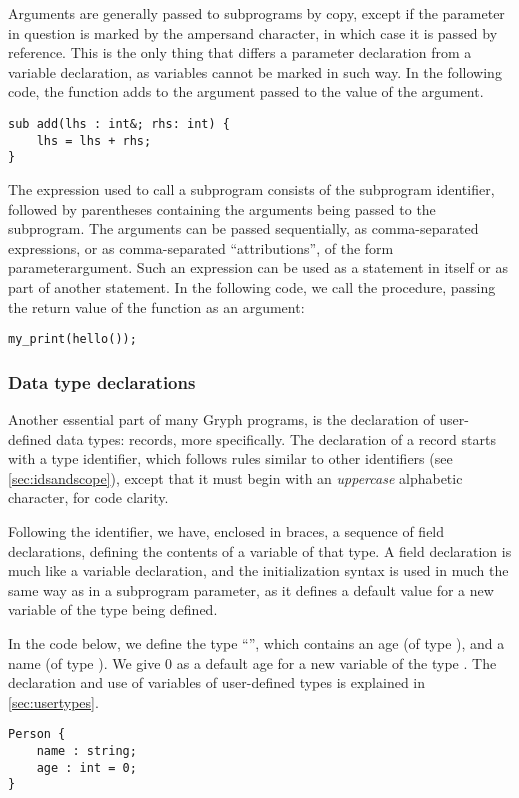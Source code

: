Arguments are generally passed to subprograms by copy, except if the parameter in question is marked by the ampersand character, in which case it is passed by reference. This is the only thing that differs a parameter declaration from a variable declaration, as variables cannot be marked in such way. In the following code, the function  adds to the argument passed to  the value of the  argument.
\begin{lstlisting}[language=Gryph]
sub add(lhs : int&; rhs: int) {
	lhs = lhs + rhs;
}
\end{lstlisting}

The expression used to call a subprogram consists of the subprogram identifier, followed by parentheses containing the arguments being passed to the subprogram. The arguments can be passed sequentially, as comma-separated expressions, or as comma-separated ``attributions'', of the form parameter\key{=}argument.
Such an expression can be used as a statement in itself or as part of another statement. In the following code, we call the  procedure, passing the return value of the  function as an argument:
\begin{lstlisting}[language=Gryph]
my_print(hello());
\end{lstlisting}

\subsubsection{Data type declarations}
\label{sec:typedecl}
Another essential part of many Gryph programs, is the declaration of user-defined data types: records, more specifically. The declaration of a record starts with a type identifier, which follows rules similar to other identifiers (see \autoref{sec:idsandscope}), except that it must begin with an \emph{uppercase} alphabetic character, for code clarity. 

Following the identifier, we have, enclosed in braces, a sequence of field declarations, defining the contents of a variable of that type. A field declaration is much like a variable declaration, and the initialization syntax is used in much the same way as in a subprogram parameter, as it defines a default value for a new variable of the type being defined.

In the code below, we define the type ``'', which contains an age (of type ), and a name (of type ). We give 0 as a default age for a new variable of the type . The declaration and use of variables of user-defined types is explained in \autoref{sec:usertypes}.
\begin{lstlisting}[language=Gryph]
Person {
	name : string;
	age : int = 0;
}
\end{lstlisting}

